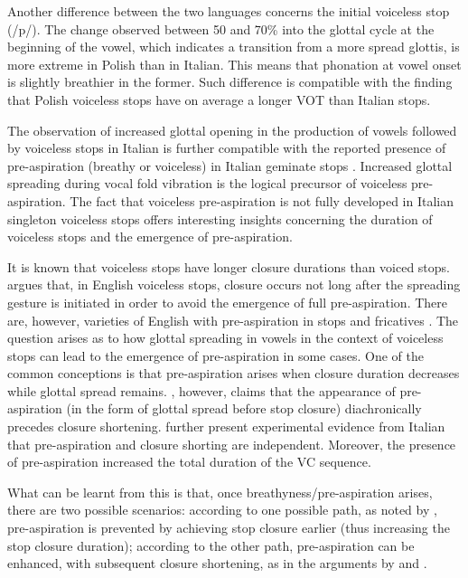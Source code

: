 \documentclass[12pt,a4paper,]{article}
\begin{document}
Another difference between the two languages concerns the initial
voiceless stop (/p/). The change observed between 50 and 70\% into the
glottal cycle at the beginning of the vowel, which indicates a
transition from a more spread glottis, is more extreme in Polish than in
Italian. This means that phonation at vowel onset is slightly breathier
in the former. Such difference is compatible with the finding that
Polish voiceless stops have on average a longer VOT than Italian stops.

The observation of increased glottal opening in the production of vowels
followed by voiceless stops in Italian is further compatible with the
reported presence of pre-aspiration (breathy or voiceless) in Italian
geminate stops
\citep{stevens2004, stevens2004a, stevens2010, stevens2010b, stevens2014a}.
Increased glottal spreading during vocal fold vibration is the logical
precursor of voiceless pre-aspiration. The fact that voiceless
pre-aspiration is not fully developed in Italian singleton voiceless
stops offers interesting insights concerning the duration of voiceless
stops and the emergence of pre-aspiration.

It is known that voiceless stops have longer closure durations than
voiced stops. \citet{lisker1974} argues that, in English voiceless
stops, closure occurs not long after the spreading gesture is initiated
in order to avoid the emergence of full pre-aspiration. There are,
however, varieties of English with pre-aspiration in stops and
fricatives \citep{gordeeva2007, nance2013, hejna2015a}. The question
arises as to how glottal spreading in vowels in the context of voiceless
stops can lead to the emergence of pre-aspiration in some cases. One of
the common conceptions is that pre-aspiration arises when closure
duration decreases while glottal spread remains. \citet{nichasaide1985},
however, claims that the appearance of pre-aspiration (in the form of
glottal spread before stop closure) diachronically precedes closure
shortening. \citet{stevens2014} further present experimental evidence
from Italian that pre-aspiration and closure shorting are independent.
Moreover, the presence of pre-aspiration increased the total duration of
the VC sequence.

What can be learnt from this is that, once breathyness/pre-aspiration
arises, there are two possible scenarios: according to one possible
path, as noted by \citet{lisker1974}, pre-aspiration is prevented by
achieving stop closure earlier (thus increasing the stop closure
duration); according to the other path, pre-aspiration can be enhanced,
with subsequent closure shortening, as in the arguments by
\citet{nichasaide1985} and \citet{stevens2014}.


\end{document}
